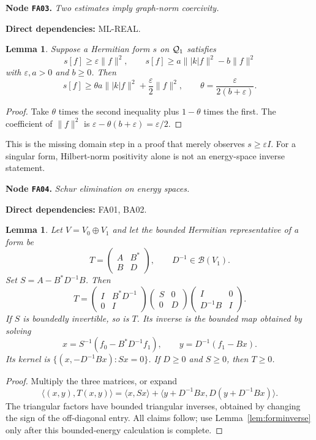 \documentclass[11pt,a4paper]{article}
\newtheorem{lemma}[theorem]{Lemma}
\theoremstyle{remark}\newtheorem{remark}[theorem]{Remark}
\newcommand{\ip}[2]{\langle #1,#2\rangle}\newcommand{\norm}[1]{\lVert #1\rVert}
\newcommand{\abs}[1]{\lvert #1\rvert}\newcommand{\rankone}[2]{\lvert #1\rangle\langle #2\rvert}
\newcommand{\node}[3]{\par\Needspace{6\baselineskip}\smallskip\hypertarget{node:#1}{}\label{nodepage:#1}\noindent\textbf{Node \texttt{#1}.} \textit{#2.}\par\noindent\textbf{Direct dependencies:} #3.\par}
\begin{document}
\node{FA03}{Two estimates imply graph-norm coercivity}{ML-REAL}
\begin{lemma}\label{lem:interpolation}
Suppose a Hermitian form $s$ on $\mathcal Q_1$ satisfies
\[
 s[f]\geq\varepsilon\norm f^2,
 \qquad s[f]\geq a\norm{\abs k f}^2-b\norm f^2
\]
with $\varepsilon,a>0$ and $b\geq0$. Then
\[
 s[f]\geq\theta a\norm{\abs k f}^2+\frac\varepsilon2\norm f^2,
 \qquad \theta=\frac\varepsilon{2(b+\varepsilon)}.
\]
\end{lemma}
\begin{proof}
Take $\theta$ times the second inequality plus $1-\theta$ times the first. The coefficient of $\norm f^2$ is $\varepsilon-\theta(b+\varepsilon)=\varepsilon/2$.
\end{proof}
This is the missing domain step in a proof that merely observes $s\geq\varepsilon I$. For a singular form, Hilbert-norm positivity alone is not an energy-space inverse statement.

\node{FA04}{Schur elimination on energy spaces}{FA01, BA02}
\begin{lemma}\label{lem:schur}
Let $V=V_0\oplus V_1$ and let the bounded Hermitian representative of a form be
\[
 T=\begin{pmatrix}A&B^*\\B&D\end{pmatrix},\qquad D^{-1}\in\mathcal B(V_1).
\]
Set $S=A-B^*D^{-1}B$. Then
\begin{equation}
 T=\begin{pmatrix}I&B^*D^{-1}\\0&I\end{pmatrix}
 \begin{pmatrix}S&0\\0&D\end{pmatrix}
 \begin{pmatrix}I&0\\D^{-1}B&I\end{pmatrix}.\label{eq:schurfactor}
\end{equation}
If $S$ is boundedly invertible, so is $T$. Its inverse is the bounded map obtained by solving
\[
 x=S^{-1}(f_0-B^*D^{-1}f_1),\qquad y=D^{-1}(f_1-Bx).
\]
Its kernel is $\{(x,-D^{-1}Bx):Sx=0\}$. If $D\geq0$ and $S\geq0$, then $T\geq0$.
\end{lemma}
\begin{proof}
Multiply the three matrices, or expand
\[
 \ip{(x,y)}{T(x,y)}=\ip x{Sx}+\ip{y+D^{-1}Bx}{D(y+D^{-1}Bx)}.
\]
The triangular factors have bounded triangular inverses, obtained by changing the sign of the off-diagonal entry. All claims follow; use Lemma~\ref{lem:forminverse} only after this bounded-energy calculation is complete.
\end{proof}
\end{document}
